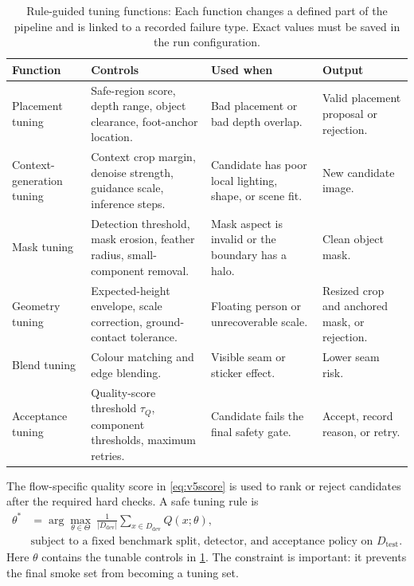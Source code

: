 \documentclass[11pt,a4paper]{article}
\begin{document}
\begin{table}[t]
  \centering
  \caption[Rule-guided tuning functions]{{Rule-guided tuning functions:} Each function changes a defined part of the pipeline and is linked to a recorded failure type. Exact values must be saved in the run configuration.}
  \label{tab:tuning-functions}
  \scriptsize
  \begin{tabular}{@{}p{2.25cm}p{3.05cm}p{3.15cm}p{3.15cm}@{}}
    \toprule
    \textbf{Function} & \textbf{Controls} & \textbf{Used when} & \textbf{Output} \\
    \midrule
    Placement tuning & Safe-region score, depth range, object clearance, foot-anchor location. & Bad placement or bad depth overlap. & Valid placement proposal or rejection. \\
    Context-generation tuning & Context crop margin, denoise strength, guidance scale, inference steps. & Candidate has poor local lighting, shape, or scene fit. & New candidate image. \\
    Mask tuning & Detection threshold, mask erosion, feather radius, small-component removal. & Mask aspect is invalid or the boundary has a halo. & Clean object mask. \\
    Geometry tuning & Expected-height envelope, scale correction, ground-contact tolerance. & Floating person or unrecoverable scale. & Resized crop and anchored mask, or rejection. \\
    Blend tuning & Colour matching and edge blending. & Visible seam or sticker effect. & Lower seam risk. \\
    Acceptance tuning & Quality-score threshold $\tau_Q$, component thresholds, maximum retries. & Candidate fails the final safety gate. & Accept, record reason, or retry. \\
    \bottomrule
  \end{tabular}
\end{table}

The flow-specific quality score in \cref{eq:v5score} is used to rank or reject candidates after the required hard checks. A safe tuning rule is
\begin{equation}\label{eq:tuning}
\begin{aligned}
  \theta^* &= \arg\max_{\theta\in\Theta}\ \frac{1}{|D_{\mathrm{dev}}|}\sum_{x\in D_{\mathrm{dev}}}Q(x;\theta), \\
  &\text{subject to a fixed benchmark split, detector, and acceptance policy on }D_{\mathrm{test}}.
\end{aligned}
\end{equation}
Here $\theta$ contains the tunable controls in \cref{tab:tuning-functions}. The constraint is important: it prevents the final smoke set from becoming a tuning set.
\end{document}
